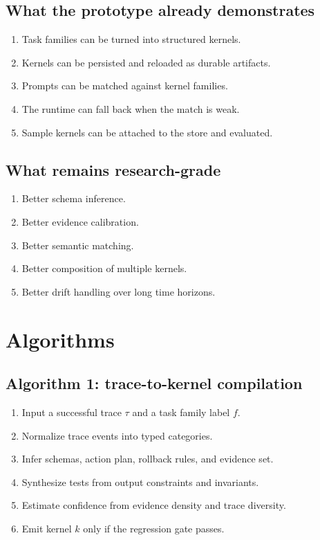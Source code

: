 \documentclass{article}
\begin{document}
\subsection{What the prototype already demonstrates}
\begin{enumerate}[leftmargin=1.2em]
\item Task families can be turned into structured kernels.
\item Kernels can be persisted and reloaded as durable artifacts.
\item Prompts can be matched against kernel families.
\item The runtime can fall back when the match is weak.
\item Sample kernels can be attached to the store and evaluated.
\end{enumerate}

\subsection{What remains research-grade}
\begin{enumerate}[leftmargin=1.2em]
\item Better schema inference.
\item Better evidence calibration.
\item Better semantic matching.
\item Better composition of multiple kernels.
\item Better drift handling over long time horizons.
\end{enumerate}

\section{Algorithms}

\subsection{Algorithm 1: trace-to-kernel compilation}
\begin{enumerate}[leftmargin=1.2em]
\item Input a successful trace $\tau$ and a task family label $f$.
\item Normalize trace events into typed categories.
\item Infer schemas, action plan, rollback rules, and evidence set.
\item Synthesize tests from output constraints and invariants.
\item Estimate confidence from evidence density and trace diversity.
\item Emit kernel $k$ only if the regression gate passes.
\end{enumerate}
\end{document}
